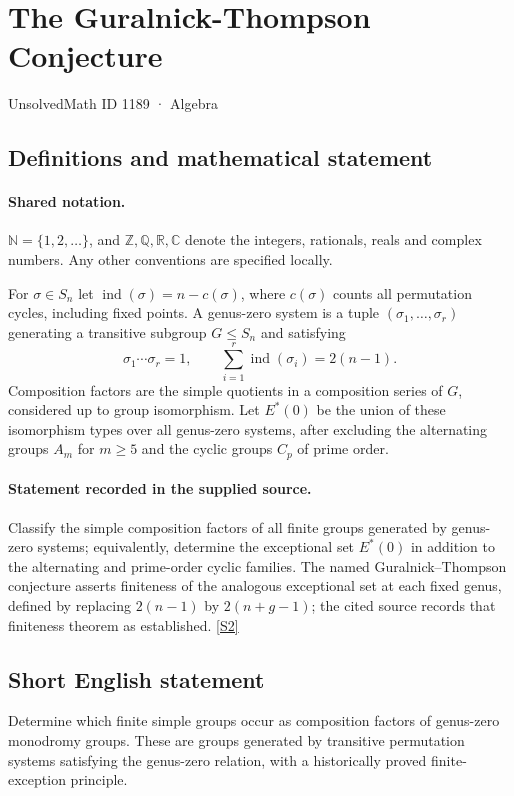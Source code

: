 \documentclass[11pt]{book}
\newcommand{\sref}[2]{\hyperlink{source:#1:#2}{[S#2]}}
\begin{document}
\setcounter{section}{1188}
\section{The Guralnick-Thompson Conjecture}\label{1189}
{\small\sffamily UnsolvedMath ID 1189 · Algebra}
\subsection{Definitions and mathematical statement}

\paragraph{Shared notation.}$\mathbb N=\{1,2,\ldots\}$, and $\mathbb Z,\mathbb Q,\mathbb R,\mathbb C$ denote the integers, rationals, reals and complex numbers. Any other conventions are specified locally.


For $\sigma\in S_n$ let $\operatorname{ind}(\sigma)=n-c(\sigma)$, where $c(\sigma)$ counts all permutation cycles, including fixed points. A genus-zero system is a tuple $(\sigma_1,\ldots,\sigma_r)$ generating a transitive subgroup $G\leq S_n$ and satisfying
\[\sigma_1\cdots\sigma_r=1,\qquad\sum_{i=1}^r\operatorname{ind}(\sigma_i)=2(n-1).\]
Composition factors are the simple quotients in a composition series of $G$, considered up to group isomorphism. Let $E^*(0)$ be the union of these isomorphism types over all genus-zero systems, after excluding the alternating groups $A_m$ for $m\geq5$ and the cyclic groups $C_p$ of prime order.
\paragraph{Statement recorded in the supplied source.}
Classify the simple composition factors of all finite groups generated by genus-zero systems; equivalently, determine the exceptional set $E^*(0)$ in addition to the alternating and prime-order cyclic families. The named Guralnick--Thompson conjecture asserts finiteness of the analogous exceptional set at each fixed genus, defined by replacing $2(n-1)$ by $2(n+g-1)$; the cited source records that finiteness theorem as established. \sref{1189}{2}
\subsection{Short English statement}
Determine which finite simple groups occur as composition factors of genus-zero monodromy groups. These are groups generated by transitive permutation systems satisfying the genus-zero relation, with a historically proved finite-exception principle.
\end{document}
